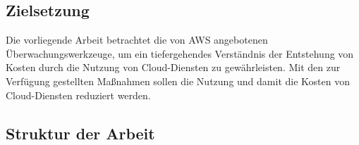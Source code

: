 \subsection{Zielsetzung}
Die vorliegende Arbeit betrachtet die von AWS angebotenen Überwachungswerkzeuge, um ein tiefergehendes Verständnis der Entstehung von Kosten durch die Nutzung von Cloud-Diensten zu gewährleisten. Mit den zur Verfügung gestellten Maßnahmen sollen die Nutzung und damit die Kosten von Cloud-Diensten reduziert werden.

\begin{comment}
\subsection*{Einschränkungen}
\addcontentsline{toc}{subsection}{Einschränkungen}

Der Schwerpunkt dieser Arbeit liegt auf EC2-Instanzen, da diese in der Regel den größten Anteil an der Rechnung ausmachen.
An zweiter Stelle stehen S3-Speichereinheiten, weil sie einen erheblichen Teil der Kosten darstellen.

{\cite{AMZ08,AMZ09}} 
\\
Diese Arbeit legt den Fokus auf die Optimierung der oben genannten Dienste.
Als Überwachungswerkzeuge für die Kosten werden die AWS CloudWatch, der AWS Cost-Explorer und der AWS Trusted Advisor untersucht. 
\end{comment}
\subsection{Struktur der Arbeit}

